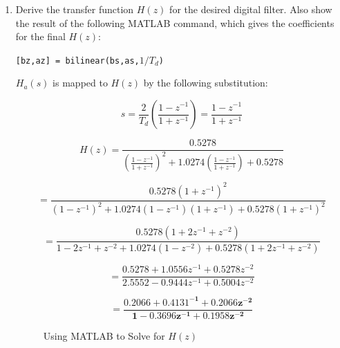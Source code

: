 \documentclass[fleqn]{article}
\begin{document}
\begin{enumerate}[nolistsep]
\begin{enumerate}
			\item Derive the transfer function $H(z)$ for the desired digital filter. Also show the result of the following MATLAB command, which gives the coefficients for the final $H(z)$:
			
			\texttt{[bz,az] = bilinear(bs,as,$1/T_d$)}
			
			$H_a(s)$ is mapped to $H(z)$ by the following substitution:
			
			\begin{equation*}
				s = \frac{2}{T_d}\left(\frac{1 - z^{-1}}{1 + z^{-1}}\right) = \frac{1 - z^{-1}}{1 + z^{-1}}
			\end{equation*}
			
			\begin{equation*}
				H(z) = \frac{0.5278}{\left(\frac{1 - z^{-1}}{1 + z^{-1}}\right)^2 + 1.0274\left(\frac{1 - z^{-1}}{1 + z^{-1}}\right) + 0.5278}
			\end{equation*}
			
			\begin{equation*}
				= \frac{0.5278(1 + z^{-1})^2}{(1 - z^{-1})^2 + 1.0274(1 - z^{-1})(1 + z^{-1}) + 0.5278(1 + z^{-1})^2}
			\end{equation*}
			
			\begin{equation*}
				= \frac{0.5278(1 + 2z^{-1} + z^{-2})}{1 - 2z^{-1} + z^{-2} + 1.0274(1 - z^{-2}) + 0.5278(1 + 2z^{-1} + z^{-2})}
			\end{equation*}
			
			\begin{equation*}
				= \frac{0.5278 + 1.0556z^{-1} + 0.5278z^{-2}}{2.5552 - 0.9444z^{-1} + 0.5004z^{-2}}
			\end{equation*}
			
			\begin{equation*}
				\mathbf{= \frac{0.2066 + 0.4131^{-1} + 0.2066z^{-2}}{1 - 0.3696z^{-1} + 0.1958z^{-2}}}
			\end{equation*}
			
			\begin{figure}[H]
					\centerline{}
					\caption{Using MATLAB to Solve for $H(z)$}
			\end{figure}
			

\end{enumerate}
\end{enumerate}
\end{document}
